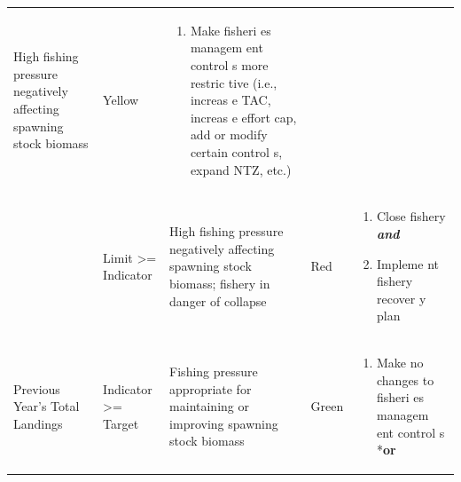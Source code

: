 \documentclass[]{book}
\providecommand{\tightlist}{%
  \setlength{\itemsep}{0pt}\setlength{\parskip}{0pt}}
\begin{document}
\begin{longtable}[]{@{}lllll@{}}
\begin{minipage}[t]{0.19\columnwidth}
High fishing pressure negatively affecting spawning stock biomass\strut
\end{minipage} & \begin{minipage}[t]{0.19\columnwidth}\raggedright\strut
Yellow\strut
\end{minipage} & \begin{minipage}[t]{0.19\columnwidth}\raggedright\strut
\begin{enumerate}
\def\labelenumi{\arabic{enumi}.}
\tightlist
\item
  Make fisheri es managem ent control s more restric tive (i.e., increas
  e TAC, increas e effort cap, add or modify certain control s, expand
  NTZ, etc.)
\end{enumerate}\strut
\end{minipage}\tabularnewline
\begin{minipage}[t]{0.19\columnwidth}\raggedright\strut
\strut
\end{minipage} & \begin{minipage}[t]{0.19\columnwidth}\raggedright\strut
Limit \textgreater{}= Indicator\strut
\end{minipage} & \begin{minipage}[t]{0.19\columnwidth}\raggedright\strut
High fishing pressure negatively affecting spawning stock biomass;
fishery in danger of collapse\strut
\end{minipage} & \begin{minipage}[t]{0.19\columnwidth}\raggedright\strut
Red\strut
\end{minipage} & \begin{minipage}[t]{0.19\columnwidth}\raggedright\strut
\begin{enumerate}
\def\labelenumi{\arabic{enumi}.}
\item
  Close fishery \textbf{\emph{and} }
\item
  Impleme nt fishery recover y plan
\end{enumerate}\strut
\end{minipage}\tabularnewline
\begin{minipage}[t]{0.19\columnwidth}\raggedright\strut
Previous Year's Total Landings\strut
\end{minipage} & \begin{minipage}[t]{0.19\columnwidth}\raggedright\strut
Indicator \textgreater{}= Target\strut
\end{minipage} & \begin{minipage}[t]{0.19\columnwidth}\raggedright\strut
Fishing pressure appropriate for maintaining or improving spawning stock
biomass\strut
\end{minipage} & \begin{minipage}[t]{0.19\columnwidth}\raggedright\strut
Green\strut
\end{minipage} & \begin{minipage}[t]{0.19\columnwidth}\raggedright\strut
\begin{enumerate}
\def\labelenumi{\arabic{enumi}.}
\tightlist
\item
  Make no changes to fisheri es managem ent control s *\textbf{or}
\end{enumerate}


\end{minipage}
\end{longtable}
\end{document}
